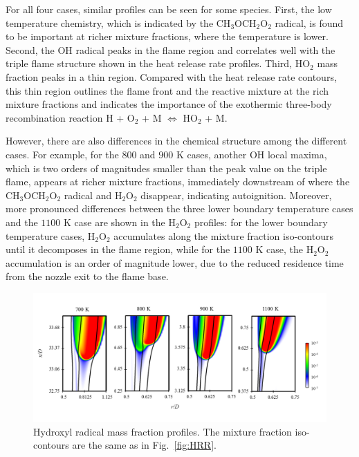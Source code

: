 \documentclass[review,3p,times]{elsarticle}
\begin{document}
For all four cases, similar profiles can be seen for some species.  First, the low temperature chemistry, which is indicated by the CH$_3$OCH$_2$O$_2$ radical, is found to be important at richer mixture fractions, where the temperature is lower.  Second, the OH radical peaks in the flame region and correlates well with the triple flame structure shown in the heat release rate profiles.  Third, HO$_2$ mass fraction peaks in a thin region.  Compared with the heat release rate contours, this thin region outlines the flame front and the reactive mixture at the rich mixture fractions and indicates the importance of the exothermic three-body recombination reaction H + O$_2$ + M $\Longleftrightarrow$ HO$_2$ + M.

However, there are also differences in the chemical structure among the different cases.  For example, for the $800$ and $900$ K cases, another OH local maxima, which is two orders of magnitudes smaller than the peak value on the triple flame, appears at richer mixture fractions, immediately downstream of where the CH$_3$OCH$_2$O$_2$ radical and H$_2$O$_2$ disappear, indicating autoignition.  Moreover, more pronounced differences between the three lower boundary temperature cases and the $1100$ K case are shown in the H$_2$O$_2$ profiles: for the lower boundary temperature cases, H$_2$O$_2$ accumulates along the mixture fraction iso-contours  until it decomposes in the flame region, while for the $1100$ K case, the H$_2$O$_2$ accumulation is an order of magnitude lower, due to the reduced residence time from the nozzle exit to the flame base.
  

\begin{figure}[t]
  \centering
  \scriptsize
  \vspace{-0.1in}
  \includegraphics[width=1.0\textwidth]{OH.png}
  \normalsize
  \vspace{-0.1in}
  \caption{Hydroxyl radical mass fraction profiles.  The mixture fraction iso-contours are the same as in Fig.~\ref{fig:HRR}.}
  \label{fig:OH}
\end{figure}
\end{document}
